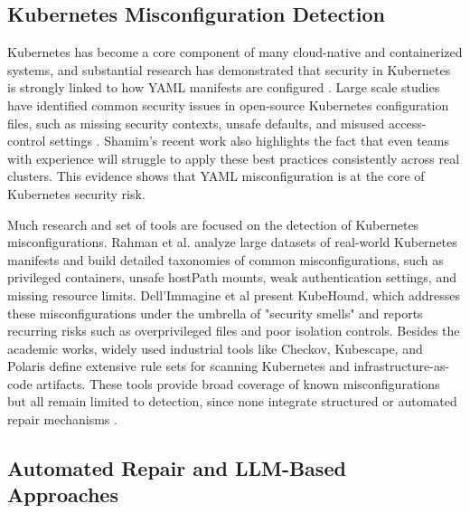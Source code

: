 \documentclass[preprint,12pt]{elsarticle}
\newcommand{\new}[1]{#1}
\begin{document}
\subsection{Kubernetes Misconfiguration Detection}



Kubernetes has become a \new{core component} of many cloud-native and containerized systems, and \new{substantial research} has demonstrated that security in Kubernetes is strongly linked to how YAML manifests are configured \cite{kamieniarz2024comparative, rahman2023k8s}. Large scale studies have identified common security issues in open-source Kubernetes configuration files, such as missing security contexts, unsafe defaults, and misused access-control settings \cite{rahman2023k8s, dellimmagine2023kubehound}. Shamim’s recent work \cite{shamim2024technoeducational} also highlights the fact that even teams with experience will struggle to apply these best practices consistently across real clusters. This evidence shows that YAML misconfiguration is at the core of Kubernetes security risk.

Much research and set of tools are focused on the detection of Kubernetes misconfigurations. Rahman et al. \cite{rahman2023k8s} analyze large datasets of real-world Kubernetes manifests and build detailed taxonomies of common misconfigurations, such as privileged containers, unsafe hostPath mounts, weak authentication settings, and missing resource limits. Dell’Immagine et al \cite{dellimmagine2023kubehound} present KubeHound, which addresses these misconfigurations under the umbrella of  "security smells" and reports recurring risks such as overprivileged files and poor isolation controls. Besides the academic works, widely used industrial tools like Checkov, Kubescape, and Polaris define extensive rule sets for scanning Kubernetes and infrastructure-as-code artifacts. These tools provide broad coverage of known misconfigurations but all remain limited to detection, since none integrate structured or automated repair mechanisms \cite{checkovtool, kubescapetool, polaristool}.

\subsection{Automated Repair and LLM-Based Approaches}
\end{document}
